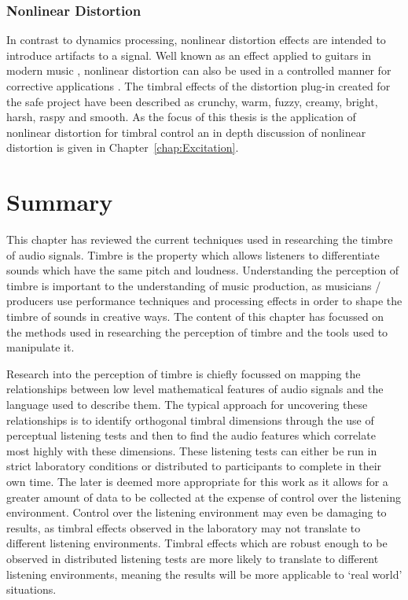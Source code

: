 		\subsubsection*{Nonlinear Distortion}
			In contrast to dynamics processing, nonlinear distortion effects are intended to introduce
			artifacts to a signal. Well known as an effect applied to guitars in modern music
			\citep{yeh2009digital}, nonlinear distortion can also be used in a controlled manner for corrective
			applications \citep{larsen2004audio}. The timbral effects of the distortion plug-in created for the
			\acrshort{safe} project have been described as crunchy, warm, fuzzy, creamy, bright, harsh, raspy
			and smooth.  As the focus of this thesis is the application of nonlinear distortion for timbral
			control an in depth discussion of nonlinear distortion is given in Chapter~\ref{chap:Excitation}. 

\section{Summary}
\label{sec:Timbre-Summary}
	This chapter has reviewed the current techniques used in researching the timbre of audio signals. Timbre is the
	property which allows listeners to differentiate sounds which have the same pitch and loudness. Understanding the
	perception of timbre is important to the understanding of music production, as musicians / producers use
	performance techniques and processing effects in order to shape the timbre of sounds in creative ways. The content
	of this chapter has focussed on the methods used in researching the perception of timbre and the tools used to
	manipulate it.
	
	Research into the perception of timbre is chiefly focussed on mapping the relationships between low level
	mathematical features of audio signals and the language used to describe them. The typical approach for uncovering
	these relationships is to identify orthogonal timbral dimensions through the use of perceptual listening tests and
	then to find the audio features which correlate most highly with these dimensions. These listening tests can either
	be run in strict laboratory conditions or distributed to participants to complete in their own time. The later is
	deemed more appropriate for this work as it allows for a greater amount of data to be collected at the expense of
	control over the listening environment. Control over the listening environment may even be damaging to results, as
	timbral effects observed in the laboratory may not translate to different listening environments. Timbral effects
	which are robust enough to be observed in distributed listening tests are more likely to translate to different
	listening environments, meaning the results will be more applicable to `real world' situations.

